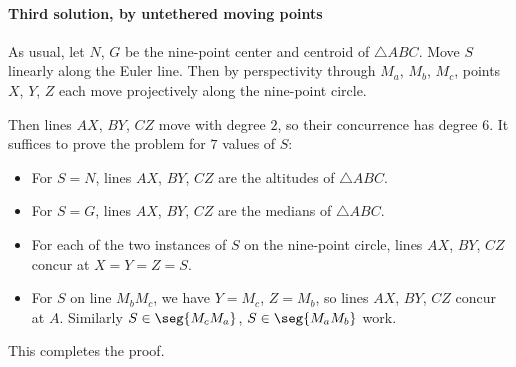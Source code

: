 \paragraph{Third solution, by untethered moving points} As usual, let $N$, $G$ be the nine-point center and centroid of $\triangle ABC$. Move $S$ linearly along the Euler line. Then by perspectivity through $M_a$, $M_b$, $M_c$, points $X$, $Y$, $Z$ each move projectively along the nine-point circle.

Then lines $AX$, $BY$, $CZ$ move with degree $2$, so their concurrence has degree $6$. It suffices to prove the problem for $7$ values of $S$:
\begin{itemize}
    \item For $S=N$, lines $AX$, $BY$, $CZ$ are the altitudes of $\triangle ABC$.
    \item For $S=G$, lines $AX$, $BY$, $CZ$ are the medians of $\triangle ABC$.
    \item For each of the two instances of $S$ on the nine-point circle, lines $AX$, $BY$, $CZ$ concur at $X=Y=Z=S$.
    \item For $S$ on line $M_bM_c$, we have $Y=M_c$, $Z=M_b$, so lines $AX$, $BY$, $CZ$ concur at $A$. Similarly $S\in\seg{M_cM_a}$, $S\in\seg{M_aM_b}$ work.
\end{itemize}
This completes the proof.

